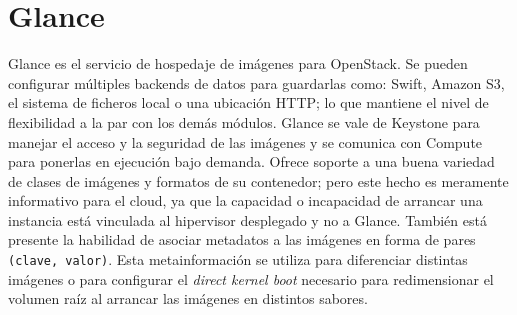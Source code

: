 \section{Glance}\label{sec:glance}
\noindent Glance es el servicio de hospedaje de im\'agenes para OpenStack. Se pueden configurar m\'ultiples backends de datos para guardarlas como: Swift, Amazon S3, el sistema de ficheros local o una ubicaci\'on HTTP; lo que mantiene el nivel de flexibilidad a la par con los dem\'as m\'odulos. Glance se vale de Keystone para manejar el acceso y la seguridad de las im\'agenes y se comunica con Compute para ponerlas en ejecuci\'on bajo demanda.
Ofrece soporte a una buena variedad de clases de im\'agenes y formatos de su contenedor; pero este hecho es meramente informativo para el cloud, ya que la capacidad o incapacidad de arrancar una instancia est\'a vinculada al hipervisor desplegado y no a Glance. Tambi\'en est\'a presente la habilidad de asociar metadatos a las im\'agenes en forma de pares \texttt{(clave, valor)}. Esta metainformaci\'on se utiliza para diferenciar distintas im\'agenes o para configurar el \emph{direct kernel boot} necesario para redimensionar el volumen ra\'iz al arrancar las im\'agenes en distintos sabores.


